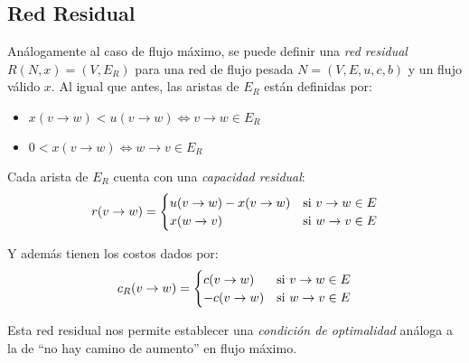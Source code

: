\subsection{Red Residual}

Análogamente al caso de flujo máximo, se puede definir una \textit{red residual} $R(N, x) = (V, E_R)$ para una red de flujo pesada $N = (V, E, u, c, b)$ y un flujo válido $x$. Al igual que antes, las aristas de $E_R$ están definidas por:
\begin{itemize}
    \item $x(v \rightarrow w) < u(v \rightarrow w) \iff v \rightarrow w \in E_R$
    \item $0 < x(v \rightarrow w) \iff w \rightarrow v \in E_R$
\end{itemize}

Cada arista de $E_R$ cuenta con una \textit{capacidad residual}:
$$
    r(v \rightarrow w) =
    \begin{cases}
        u(v \rightarrow w) - x(v \rightarrow w) & \text{si } v \rightarrow w \in E \\
        x(w \rightarrow v)                      & \text{si } w \rightarrow v \in E
    \end{cases}
$$

Y además tienen los costos dados por:
$$
    c_R(v \rightarrow w) =
    \begin{cases}
        c(v \rightarrow w)  & \text{si } v \rightarrow w \in E \\
        -c(v \rightarrow w) & \text{si } w \rightarrow v \in E
    \end{cases}
$$

Esta red residual nos permite establecer una \textit{condición de optimalidad} análoga a la de ``no hay camino de aumento'' en flujo máximo.

